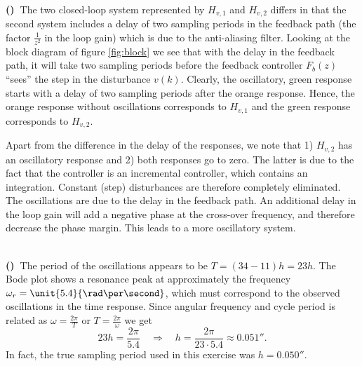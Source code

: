 \documentclass[letterpaper,12pt]{scrartcl}
\newenvironment{exercise}[1][Problem]{\begin{trivlist} \item[\hskip
    \labelsep {\stepcounter{exerctr}\bfseries #1
      \arabic{exerctr}}]}{\end{trivlist}\vspace{10mm}}
\newcounter{exerctr}
\newcounter{abcctr}[exerctr]
\newcommand{\abc}{\noindent\vspace{1mm}\\ {\bf
    \stepcounter{abcctr}(\alph{abcctr})\ }}
\begin{document}
\begin{exercise}
\abc The two closed-loop system represented by $H_{v,1}$ and $H_{v,2}$ differs in that the second system includes a delay of two sampling periods in the feedback path (the factor $\frac{1}{z^2}$ in the loop gain) which is due to the anti-aliasing filter. Looking at the block diagram of figure \ref{fig:block} we see that with the delay in the feedback path, it will take two sampling periods before the feedback controller $F_b(z)$ ``sees'' the step in the disturbance $v(k)$. Clearly, the oscillatory, green response starts with a delay of two sampling periods after the orange response. Hence, the orange response without oscillations corresponds to $H_{v,1}$ and the green response corresponds to $H_{v,2}$.

Apart from the difference in the delay of the responses, we note that 1) $H_{v,2}$ has an oscillatory response and 2) both responses go to zero. The latter is due to the fact that the controller is an incremental controller, which contains an integration. Constant (step) disturbances are therefore completely eliminated. The oscillations are due to the delay in the feedback path. An additional  delay in the loop gain will add a negative phase at the cross-over frequency, and therefore decrease the phase margin. This leads to a more oscillatory system.
 
\abc The period of the oscillations appears to be $T=(34-11)h=23h$. The Bode plot shows a resonance peak at approximately the frequency $\omega_r = \unit{5.4}{\rad\per\second}$, which must correspond to the observed oscillations in the time response. Since angular frequency and cycle period is related as $\omega = \frac{2\pi}{T}$ or $T = \frac{2\pi}{\omega}$ we get
\[ 23h = \frac{2\pi}{5.4} \quad \Rightarrow \quad h = \frac{2\pi}{23\cdot 5.4} \approx \unit{0.051}{\second}. \]
In fact, the true sampling period used in this exercise was $h=\unit{0.050}{\second}$.  
\end{exercise}
\end{document}
